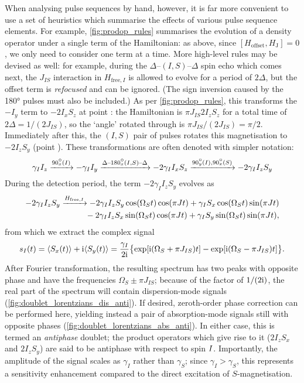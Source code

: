 When analysing pulse sequences by hand, however, it is far more convenient to use a set of heuristics which summarise the effects of various pulse sequence elements.
For example, \cref{fig:prodop_rules} summarises the evolution of a density operator under a single term of the Hamiltonian: as above, since $[H_\text{offset}, H_\text{J}] = 0$, we only need to consider one term at a time.
More high-level rules may be devised as well: for example, during the $\Delta$--$(I,S)$--$\Delta$ spin echo which comes next, the $J_{IS}$ interaction in $H_{\text{free},I}$ is allowed to evolve for a period of $2\Delta$, but the offset term is \textit{refocused} and can be ignored.
(The sign inversion caused by the \ang{180} pulses must also be included.)
As per \cref{fig:prodop_rules}, this transforms the $-I_y$ term to $-2I_xS_z$ at point : the Hamiltonian is $\pi J_{IS} 2I_zS_z$ for a total time of $2\Delta = 1/(2J_{IS})$, so the `angle' rotated through is $\pi J_{IS}/(2J_{IS}) = \pi/2$.
Immediately after this, the $(I,S)$ pair of pulses rotates this magnetisation to $-2I_zS_y$ (point ).
These transformations are often denoted with simpler notation:
\begin{equation}
    \label{eq:inept_prodop}
    \gamma_I I_z
    \xrightarrow{\angang{90}{x}(I)} -\gamma_I I_y
    \xrightarrow{\Delta\text{--}\angang{180}{x}(I,S)\text{--}\Delta} -2\gamma_I I_xS_z
    \xrightarrow{\angang{90}{y}(I),\angang{90}{x}(S)} -2\gamma_I I_zS_y
\end{equation}
During the detection period, the term $-2\gamma_II_zS_y$ evolves as
\begin{align}
    \label{eq:inept_fid_prodop}
    -2\gamma_I I_zS_y \xrightarrow{H_{\text{free},I}} -2\gamma_I I_zS_y\cos(\Omega_St)\cos(\pi Jt) + \gamma_I S_x\cos(\Omega_St)\sin(\pi Jt) \notag{} \\
    \qquad {} - 2\gamma_I I_zS_x\sin(\Omega_St)\cos(\pi Jt) + \gamma_I S_y\sin(\Omega_S t)\sin(\pi Jt),
\end{align}
from which we extract the complex signal
\begin{equation}
    \label{eq:inept_fid}
    s_I(t) = \langle S_x(t) \rangle + \mathrm{i} \langle S_y(t) \rangle = \frac{\gamma_I}{2\mathrm{i}}\bigl\{\exp[\mathrm{i}(\Omega_S + \pi J_{IS})t] - \exp[\mathrm{i}(\Omega_S - \pi J_{IS})t]\bigr\}.
\end{equation}
After Fourier transformation, the resulting spectrum has two peaks with opposite phase and have the frequencies $\Omega_S \pm \pi J_{IS}$; because of the factor of $1/(2\mathrm{i})$, the real part of the spectrum will contain dispersion-mode signals (\cref{fig:doublet_lorentzians_dis_anti}).
If desired, zeroth-order phase correction can be performed here, yielding instead a pair of absorption-mode signals still with opposite phases (\cref{fig:doublet_lorentzians_abs_anti}).
In either case, this is termed an \textit{antiphase} doublet; the product operators which give rise to it ($2I_zS_x$ and $2I_zS_y$) are said to be antiphase with respect to spin $I\/$.
Importantly, the amplitude of the signal scales as $\gamma_I$ rather than $\gamma_S$; since $\gamma_I > \gamma_S$, this represents a sensitivity enhancement compared to the direct excitation of $S$-magnetisation.


